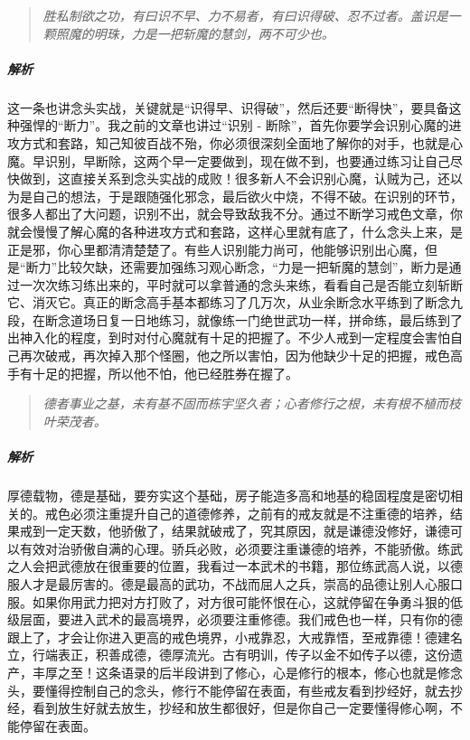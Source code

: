 \begin{quote}\it
    胜私制欲之功，有曰识不早、力不易者，有曰识得破、忍不过者。盖识是一颗照魔的明珠，力是一把斩魔的慧剑，两不可少也。
\end{quote}

\subparagraph{解析} 这一条也讲念头实战，关键就是“识得早、识得破”，然后还要“断得快”，要具备这种强悍的“断力”。我之前的文章也讲过“识别 - 断除”，首先你要学会识别心魔的进攻方式和套路，知己知彼百战不殆，你必须很深刻全面地了解你的对手，也就是心魔。早识别，早断除，这两个早一定要做到，现在做不到，也要通过练习让自己尽快做到，这直接关系到念头实战的成败！很多新人不会识别心魔，认贼为己，还以为是自己的想法，于是跟随强化邪念，最后欲火中烧，不得不破。在识别的环节，很多人都出了大问题，识别不出，就会导致敌我不分。通过不断学习戒色文章，你就会慢慢了解心魔的各种进攻方式和套路，这样心里就有底了，什么念头上来，是正是邪，你心里都清清楚楚了。有些人识别能力尚可，他能够识别出心魔，但是“断力”比较欠缺，还需要加强练习观心断念，“力是一把斩魔的慧剑”，断力是通过一次次练习练出来的，平时就可以拿普通的念头来练，看看自己是否能立刻斩断它、消灭它。真正的断念高手基本都练习了几万次，从业余断念水平练到了断念九段，在断念道场日复一日地练习，就像练一门绝世武功一样，拼命练，最后练到了出神入化的程度，到时对付心魔就有十足的把握了。不少人戒到一定程度会害怕自己再次破戒，再次掉入那个怪圈，他之所以害怕，因为他缺少十足的把握，戒色高手有十足的把握，所以他不怕，他已经胜券在握了。

\begin{quote}\it
    德者事业之基，未有基不固而栋宇坚久者；心者修行之根，未有根不植而枝叶荣茂者。
\end{quote}

\subparagraph{解析} 厚德载物，德是基础，要夯实这个基础，房子能造多高和地基的稳固程度是密切相关的。戒色必须注重提升自己的道德修养，之前有的戒友就是不注重德的培养，结果戒到一定天数，他骄傲了，结果就破戒了，究其原因，就是谦德没修好，谦德可以有效对治骄傲自满的心理。骄兵必败，必须要注重谦德的培养，不能骄傲。练武之人会把武德放在很重要的位置，我看过一本武术的书籍，那位练武高人说，以德服人才是最厉害的。德是最高的武功，不战而屈人之兵，崇高的品德让别人心服口服。如果你用武力把对方打败了，对方很可能怀恨在心，这就停留在争勇斗狠的低级层面，要进入武术的最高境界，必须要注重修德。我们戒色也一样，只有你的德跟上了，才会让你进入更高的戒色境界，小戒靠忍，大戒靠悟，至戒靠德！德建名立，行端表正，积善成德，德厚流光。古有明训，传子以金不如传子以德，这份遗产，丰厚之至！这条语录的后半段讲到了修心，心是修行的根本，修心也就是修念头，要懂得控制自己的念头，修行不能停留在表面，有些戒友看到抄经好，就去抄经，看到放生好就去放生，抄经和放生都很好，但是你自己一定要懂得修心啊，不能停留在表面。

